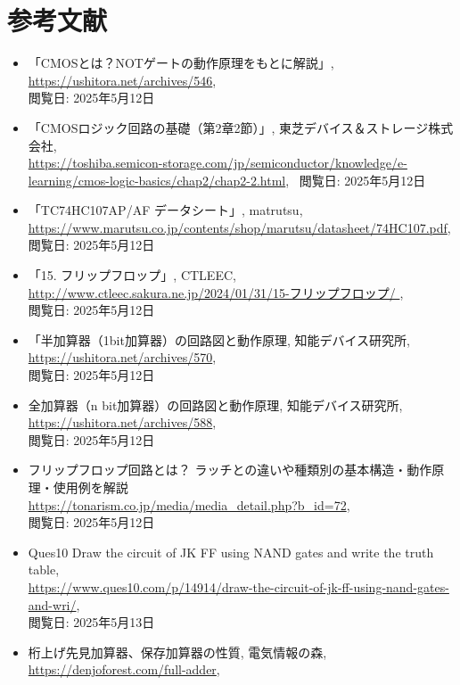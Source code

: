 \documentclass{jlreq}
\numberwithin{equation}{section}
\begin{document}
\section{参考文献}
\begin{itemize}
\item 「CMOSとは？NOTゲートの動作原理をもとに解説」, \\
\url{https://ushitora.net/archives/546}, \\
閲覧日: 2025年5月12日
\item 「CMOSロジック回路の基礎（第2章2節）」, 東芝デバイス＆ストレージ株式会社, \\
\url{https://toshiba.semicon-storage.com/jp/semiconductor/knowledge/e-learning/cmos-logic-basics/chap2/chap2-2.html}, \
閲覧日: 2025年5月12日
\item 「TC74HC107AP/AF データシート」, matrutsu, \\
\url{https://www.marutsu.co.jp/contents/shop/marutsu/datasheet/74HC107.pdf}, \\
閲覧日: 2025年5月12日
\item 「15. フリップフロップ」, CTLEEC, \\
\url{http://www.ctleec.sakura.ne.jp/2024/01/31/15-フリップフロップ/ }, \\
閲覧日: 2025年5月12日
\item 「半加算器（1bit加算器）の回路図と動作原理, 知能デバイス研究所, \\
\url{https://ushitora.net/archives/570}, \\
閲覧日: 2025年5月12日
\item 全加算器（n bit加算器）の回路図と動作原理, 知能デバイス研究所, \\
\url{https://ushitora.net/archives/588}, \\
閲覧日: 2025年5月12日
\item フリップフロップ回路とは？ ラッチとの違いや種類別の基本構造・動作原理・使用例を解説 \\
\url{https://tonarism.co.jp/media/media_detail.php?b_id=72}, \\
閲覧日: 2025年5月12日
\item Ques10 Draw the circuit of JK FF using NAND gates and write the truth table, \\
\url{https://www.ques10.com/p/14914/draw-the-circuit-of-jk-ff-using-nand-gates-and-wri/}, \\
閲覧日: 2025年5月13日
\item 桁上げ先見加算器、保存加算器の性質, 電気情報の森, \\
\url{https://denjoforest.com/full-adder}, \\

\end{itemize}
\end{document}
